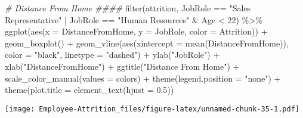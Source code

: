 \documentclass[
]{article}
\newenvironment{Shaded}{\begin{snugshade}}{\end{snugshade}}
\newcommand{\AttributeTok}[1]{\textcolor[rgb]{0.77,0.63,0.00}{#1}}
\newcommand{\CommentTok}[1]{\textcolor[rgb]{0.56,0.35,0.01}{\textit{#1}}}
\newcommand{\DecValTok}[1]{\textcolor[rgb]{0.00,0.00,0.81}{#1}}
\newcommand{\FloatTok}[1]{\textcolor[rgb]{0.00,0.00,0.81}{#1}}
\newcommand{\FunctionTok}[1]{\textcolor[rgb]{0.00,0.00,0.00}{#1}}
\newcommand{\NormalTok}[1]{#1}
\newcommand{\SpecialCharTok}[1]{\textcolor[rgb]{0.00,0.00,0.00}{#1}}
\newcommand{\StringTok}[1]{\textcolor[rgb]{0.31,0.60,0.02}{#1}}
\begin{document}
\begin{Shaded}
\begin{Highlighting}[]
\CommentTok{\# Distance From Home \#\#\#\#}
\FunctionTok{filter}\NormalTok{(attrition, JobRole }\SpecialCharTok{==} \StringTok{"Sales Representative"} \SpecialCharTok{|}\NormalTok{ JobRole }\SpecialCharTok{==} \StringTok{"Human Resources"} \SpecialCharTok{\&}\NormalTok{ Age }\SpecialCharTok{\textless{}} \DecValTok{22}\NormalTok{) }\SpecialCharTok{\%\textgreater{}\%}
  \FunctionTok{ggplot}\NormalTok{(}\FunctionTok{aes}\NormalTok{(}\AttributeTok{x =}\NormalTok{ DistanceFromHome, }\AttributeTok{y =}\NormalTok{ JobRole, }\AttributeTok{color =}\NormalTok{ Attrition)) }\SpecialCharTok{+}
  \FunctionTok{geom\_boxplot}\NormalTok{() }\SpecialCharTok{+}
  \FunctionTok{geom\_vline}\NormalTok{(}\FunctionTok{aes}\NormalTok{(}\AttributeTok{xintercept =} \FunctionTok{mean}\NormalTok{(DistanceFromHome)), }\AttributeTok{color =} \StringTok{"black"}\NormalTok{, }\AttributeTok{linetype =} \StringTok{"dashed"}\NormalTok{) }\SpecialCharTok{+}
  \FunctionTok{ylab}\NormalTok{(}\StringTok{"JobRole"}\NormalTok{) }\SpecialCharTok{+}
  \FunctionTok{xlab}\NormalTok{(}\StringTok{"DistanceFromHome"}\NormalTok{) }\SpecialCharTok{+}
  \FunctionTok{ggtitle}\NormalTok{(}\StringTok{"Distance From Home"}\NormalTok{) }\SpecialCharTok{+}
  \FunctionTok{scale\_color\_manual}\NormalTok{(}\AttributeTok{values =}\NormalTok{ colors) }\SpecialCharTok{+}
  \FunctionTok{theme}\NormalTok{(}\AttributeTok{legend.position =} \StringTok{"none"}\NormalTok{) }\SpecialCharTok{+}
  \FunctionTok{theme}\NormalTok{(}\AttributeTok{plot.title =} \FunctionTok{element\_text}\NormalTok{(}\AttributeTok{hjust =} \FloatTok{0.5}\NormalTok{)) }
\end{Highlighting}
\end{Shaded}

\texttt{[image: Employee-Attrition\_files/figure-latex/unnamed-chunk-35-1.pdf]}
\end{document}
